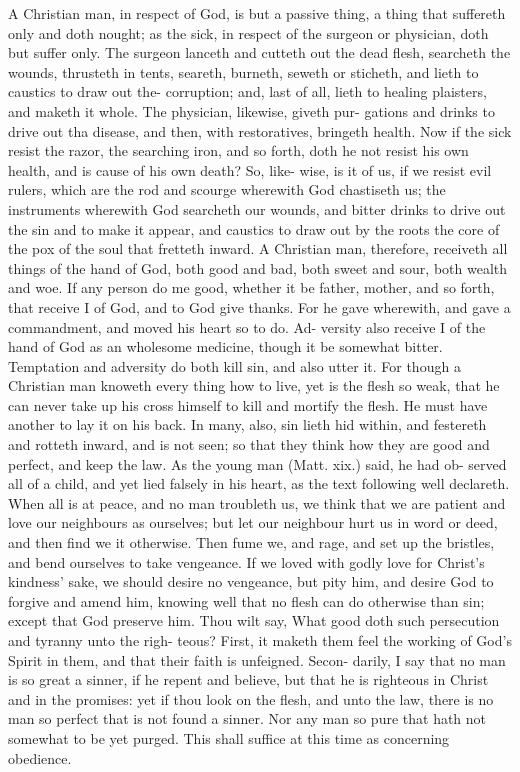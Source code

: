 \documentclass{custom}
\begin{document}
A Christian man, in respect of God, is but a passive thing,
a thing that suffereth only and doth nought; as the sick, 
in respect of the surgeon or physician, doth but suffer 
only. The surgeon lanceth and cutteth out the dead flesh, 
searcheth the wounds, thrusteth in tents, seareth, burneth, 
seweth or sticheth, and lieth to caustics to draw out the- 
corruption; and, last of all, lieth to healing plaisters, and 
maketh it whole. The physician, likewise, giveth pur- 
gations and drinks to drive out tha disease, and then, with 
restoratives, bringeth health. Now if the sick resist the 
razor, the searching iron, and so forth, doth he not resist 
his own health, and is cause of his own death? So, like- 
wise, is it of us, if we resist evil rulers, which are the rod
and scourge wherewith God chastiseth us; the instruments 
wherewith God searcheth our wounds, and bitter drinks 
to drive out the sin and to make it appear, and caustics to 
draw out by the roots the core of the pox of the soul that 
fretteth inward. A Christian man, therefore, receiveth all 
things of the hand of God, both good and bad, both sweet 
and sour, both wealth and woe. If any person do me good, 
whether it be father, mother, and so forth, that receive I of 
God, and to God give thanks. For he gave wherewith, and 
gave a commandment, and moved his heart so to do. Ad- 
versity also receive I of the hand of God as an wholesome 
medicine, though it be somewhat bitter. Temptation and 
adversity do both kill sin, and also utter it. For though a 
Christian man knoweth every thing how to live, yet is the 
flesh so weak, that he can never take up his cross himself 
to kill and mortify the flesh. He must have another to 
lay it on his back. In many, also, sin lieth hid within, 
and festereth and rotteth inward, and is not seen; so that 
they think how they are good and perfect, and keep the 
law. As the young man (Matt. xix.) said, he had ob- 
served all of a child, and yet lied falsely in his heart, as 
the text following well declareth. When all is at peace, 
and no man troubleth us, we think that we are patient and 
love our neighbours as ourselves; but let our neighbour 
hurt us in word or deed, and then find we it otherwise.
Then fume we, and rage, and set up the bristles, and bend 
ourselves to take vengeance. If we loved with godly love 
for Christ's kindness' sake, we should desire no vengeance, 
but pity him, and desire God to forgive and amend him, 
knowing well that no flesh can do otherwise than sin;
except that God preserve him. Thou wilt say, What 
good doth such persecution and tyranny unto the righ-
teous? First, it maketh them feel the working of God's 
Spirit in them, and that their faith is unfeigned. Secon- 
darily, I say that no man is so great a sinner, if he repent 
and believe, but that he is righteous in Christ and in the 
promises: yet if thou look on the flesh, and unto the law, 
there is no man so perfect that is not found a sinner. Nor 
any man so pure that hath not somewhat to be yet purged.
This shall suffice at this time as concerning obedience. 
\end{document}
